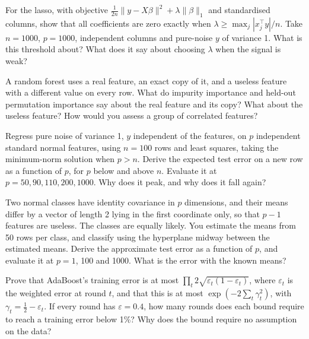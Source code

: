 \begin{question}\label{iq:iv1:machine-learning:41}
For the lasso, with objective $\frac{1}{2n}\|y - X\beta\|^2 + \lambda\|\beta\|_1$ and standardised columns, show that all coefficients are zero exactly when $\lambda \ge \max_j|x_j^\top y|/n$. Take $n = 1000$, $p = 1000$, independent columns and pure-noise $y$ of variance 1. What is this threshold about? What does it say about choosing $\lambda$ when the signal is weak?
\end{question}

\begin{question}\label{iq:iv1:machine-learning:42}
A random forest uses a real feature, an exact copy of it, and a useless feature with a different value on every row. What do impurity importance and held-out permutation importance say about the real feature and its copy? What about the useless feature? How would you assess a group of correlated features?
\end{question}

\begin{question}\label{iq:iv1:machine-learning:43}
Regress pure noise of variance 1, $y$ independent of the features, on $p$ independent standard normal features, using $n = 100$ rows and least squares, taking the minimum-norm solution when $p > n$. Derive the expected test error on a new row as a function of $p$, for $p$ below and above $n$. Evaluate it at $p = 50, 90, 110, 200, 1000$. Why does it peak, and why does it fall again?
\end{question}

\begin{question}\label{iq:iv1:machine-learning:44}
Two normal classes have identity covariance in $p$ dimensions, and their means differ by a vector of length 2 lying in the first coordinate only, so that $p - 1$ features are useless. The classes are equally likely. You estimate the means from 50 rows per class, and classify using the hyperplane midway between the estimated means. Derive the approximate test error as a function of $p$, and evaluate it at $p = 1$, 100 and 1000. What is the error with the known means?
\end{question}

\begin{question}\label{iq:iv1:machine-learning:45}
Prove that AdaBoost's training error is at most $\prod_t 2\sqrt{\varepsilon_t(1 - \varepsilon_t)}$, where $\varepsilon_t$ is the weighted error at round $t$, and that this is at most $\exp(-2\sum_t\gamma_t^2)$, with $\gamma_t = \frac12 - \varepsilon_t$. If every round has $\varepsilon = 0.4$, how many rounds does each bound require to reach a training error below 1\%? Why does the bound require no assumption on the data?
\end{question}
